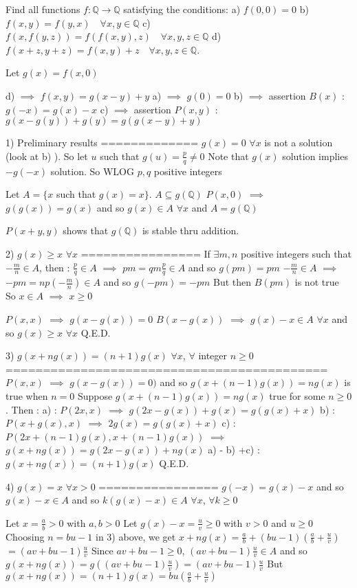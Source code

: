 \begin{solution}
	\begin{tcolorbox}Find all functions $f: \mathbb Q\to\mathbb  Q$ satisfying the conditions:
a) $f (0, 0) = 0$
b) $f (x, y) = f (y, x) \quad \forall x, y \in\mathbb Q$
c) $f (x, f (y, z)) = f (f (x, y), z)\quad \forall x, y, z \in\mathbb Q$ 
d) $f (x + z, y + z) = f (x, y) + z\quad \forall x, y, z \in\mathbb Q$.\end{tcolorbox}
Let $g(x)=f(x,0)$

d) $\implies$ $f(x,y)=g(x-y)+y$
a) $\implies$ $g(0)=0$
b) $\implies$ assertion $B(x)$ : $g(-x)=g(x)-x$
c) $\implies$ assertion $P(x,y)$ : $g(x-g(y))+g(y)=g(g(x-y)+y)$

1) Preliminary results
=============
$g(x)=0$ $\forall x$ is not a solution (look at b) ). So let $u$ such that $g(u)=\frac pq\ne 0$
Note that $g(x)$ solution implies $-g(-x)$ solution. So WLOG $p,q$ positive integers

Let $A=\{x$ such that $g(x)=x\}$. $A\subseteq g(\mathbb Q)$
$P(x,0)$ $\implies$ $g(g(x))=g(x)$ and so $g(x)\in A$ $\forall x$ and $A=g(\mathbb Q)$

$P(x+y,y)$ shows that $g(\mathbb Q)$ is stable thru addition.

2) $g(x)\ge x$ $\forall x$
================
If $\exists m,n$ positive integers such that $-\frac mn\in A$, then :
$\frac pq\in A$ $\implies$ $pm=qm\frac pq\in A$ and so $g(pm)=pm$
$-\frac mn\in A$ $\implies$ $-pm=np(-\frac mn)\in A$ and so $g(-pm)=-pm$
But then $B(pm)$ is not true
So $x\in A$ $\implies$ $x\ge 0$

$P(x,x)$ $\implies$ $g(x-g(x))=0$
$B(x-g(x))$ $\implies$ $g(x)-x\in A$ $\forall x$ and so $g(x)\ge x$ $\forall x$
Q.E.D.

3) $g(x+ng(x))=(n+1)g(x)$ $\forall x$, $\forall$ integer $n\ge 0$
===========================================
$P(x,x)$ $\implies$ $g(x-g(x))=0)$ and so $g(x+(n-1)g(x))=ng(x)$ is true when $n=0$
Suppose $g(x+(n-1)g(x))=ng(x)$ true for some $n\ge 0$. Then :
a) : $P(2x,x)$ $\implies$ $g(2x-g(x))+g(x)=g(g(x)+x)$
b) : $P(x+g(x),x)$ $\implies$ $2g(x)=g(g(x)+x)$
c) : $P(2x+(n-1)g(x),x+(n-1)g(x))$ $\implies$ $g(x+ng(x))=g(2x-g(x))+ng(x)$
a) - b) +c) : $g(x+ng(x))=(n+1)g(x)$
Q.E.D.

4) $g(x)=x$ $\forall x>0$
================
$g(-x)=g(x)-x$ and so $g(x)-x\in A$ and so $k(g(x)-x)\in A$ $\forall x$, $\forall k\ge 0$

Let $x= \frac ab>0$ with $a,b>0$
Let $g(x)-x=\frac uv\ge 0$ with $v>0$ and $u\ge 0$
Choosing $n=bu-1$ in 3) above, we get $x+ng(x)=\frac ab+(bu-1)(\frac ab+\frac uv)$ $=(av+bu-1)\frac uv$
Since $av+bu-1\ge 0$, $(av+bu-1)\frac uv\in A$ and so $g(x+ng(x))=g((av+bu-1)\frac uv)=(av+bu-1)\frac uv$
But $g(x+ng(x))=(n+1)g(x)=bu(\frac ab+\frac uv)$


\end{solution}
